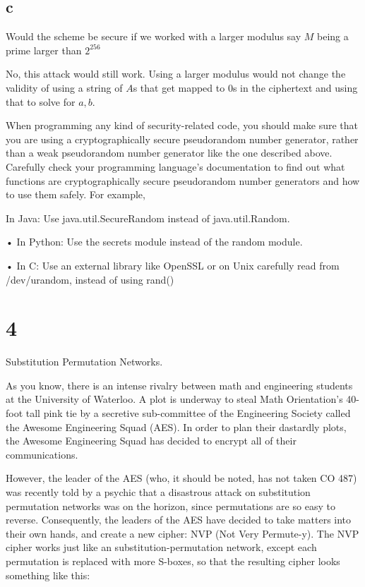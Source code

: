 \documentclass[11pt]{article}
\begin{document}
\subsection{c} Would the scheme be secure if we worked with a larger modulus say $M$ being a prime larger than $2^{256}$

No, this attack would still work. Using a larger modulus would not change the validity of using a string of $A$s that get mapped to $0$s in the ciphertext and using that to solve for $a,b$.

When programming any kind of security-related code, you should make sure that you are using a cryptographically secure pseudorandom number generator, rather than a weak pseudorandom number generator like the one described above. Carefully check your programming language's documentation to ﬁnd out what functions are cryptographically secure pseudorandom number generators and how to use them safely. For example,

In Java: Use java.util.SecureRandom instead of java.util.Random.

• In Python: Use the secrets module instead of the random module.

• In C: Use an external library like OpenSSL or on Unix carefully read from /dev/urandom, instead of using rand()

\section{4} Substitution Permutation Networks.

As you know, there is an intense rivalry between math and engineering students at the University of Waterloo. A plot is underway to steal Math Orientation's 40-foot tall pink tie by a secretive sub-committee of the Engineering Society called the Awesome Engineering Squad (AES). In order to plan their dastardly plots, the Awesome Engineering Squad has decided to encrypt all of their communications.

However, the leader of the AES (who, it should be noted, has not taken CO 487) was recently told by a psychic that a disastrous attack on substitution permutation networks was on the horizon, since permutations are so easy to reverse. Consequently, the leaders of the AES have decided to take matters into their own hands, and create a new cipher: NVP (Not Very Permute-y). The NVP cipher works just like an substitution-permutation network, except each permutation is replaced with more S-boxes, so that the resulting cipher looks something like this:
\end{document}
